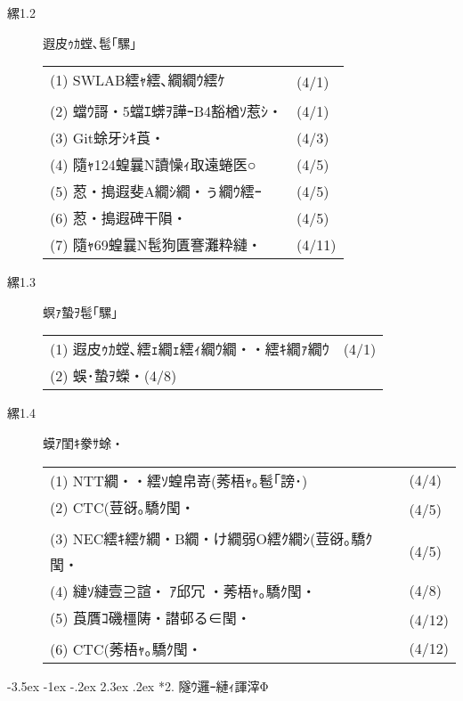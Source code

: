 \documentclass[fleqn, 12pt]{extarticlej}
\makeatletter
\def\section{\@startsection {section}{1}{\z@}%
{-3.5ex \@plus -1ex \@minus -.2ex}%
{2.3ex \@plus.2ex}%
{\sectionformat}}
\def\sectionformat{\normalsize}
\makeatother
\begin{document}
{\begin{description}
  \item[縲1.2] 遐皮ｩｶ螳､髢｢騾｣

    \begin{tabular}{p{11.8cm}l}
      (1) SWLAB繧ｬ繧､繝繝ｳ繧ｹ & (4/1)\\
      (2) 蟷ｳ謌・5蟷ｴ蠎ｦ譁ｰB4豁楢ｿ惹ｼ・& (4/1)\\
      (3) Git蜍牙ｼｷ莨・& (4/3)\\
      (4) 隨ｬ124蝗曩N讀懆ｨ取遠蜷医○ & (4/5)\\
      (5) 荵・搗遐斐Α繝ｼ繝・ぅ繝ｳ繧ｰ & (4/5)\\
      (6) 荵・搗遐碑干隕・& (4/5)\\
      (7) 隨ｬ69蝗曩N髢狗匱謇灘粋縺・& (4/11)\\
    \end{tabular}

  \item[縲1.3] 螟ｧ蟄ｦ髢｢騾｣

    \begin{tabular}{p{11.8cm}l}
      (1) 遐皮ｩｶ螳､繧ｪ繝ｪ繧ｨ繝ｳ繝・・繧ｷ繝ｧ繝ｳ&(4/1)\\
      (2) 蜈･蟄ｦ蠑・(4/8)\\
    \end{tabular}

  \item[縲1.4] 蟆ｱ閨ｷ豢ｻ蜍・

    \begin{tabular}{p{11.8cm}l}
      (1) NTT繝・・繧ｿ蝗帛嵜(莠梧ｬ｡髱｢謗･)&(4/4)\\
      (2) CTC(荳谺｡驕ｸ閠・&(4/5)\\
      (3) NEC繧ｷ繧ｹ繝・Β繝・け繝弱Ο繧ｸ繝ｼ(荳谺｡驕ｸ閠・&(4/5)\\
      (4) 縺ｿ縺壹⊇諠・ｱ邱冗・莠梧ｬ｡驕ｸ閠・&(4/8)\\
      (5) 莨贋ｺ磯橿陦・譛邨る∈閠・&(4/12)\\
      (6) CTC(莠梧ｬ｡驕ｸ閠・&(4/12)\\
    \end{tabular}
\end{description}

\vspace{-1.5em}
\section*{2. 隧ｳ邏ｰ縺ｨ諢滓Φ}
\vspace{-1.0em}

\begin{description}
  \itemsep -1mm


\end{description}}
\end{document}
